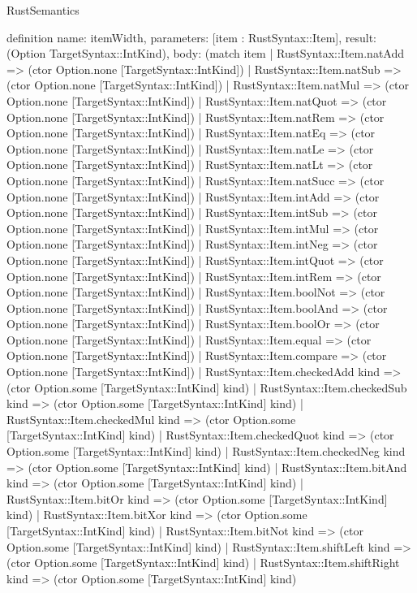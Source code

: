 \begin{lexlean}{RustSemantics}
\begin{semanticmodule}
definition{
  name: itemWidth,
  parameters: [item : RustSyntax::Item],
  result: (Option TargetSyntax::IntKind),
  body: (match item
    | RustSyntax::Item.natAdd => (ctor Option.none [TargetSyntax::IntKind])
    | RustSyntax::Item.natSub => (ctor Option.none [TargetSyntax::IntKind])
    | RustSyntax::Item.natMul => (ctor Option.none [TargetSyntax::IntKind])
    | RustSyntax::Item.natQuot => (ctor Option.none [TargetSyntax::IntKind])
    | RustSyntax::Item.natRem => (ctor Option.none [TargetSyntax::IntKind])
    | RustSyntax::Item.natEq => (ctor Option.none [TargetSyntax::IntKind])
    | RustSyntax::Item.natLe => (ctor Option.none [TargetSyntax::IntKind])
    | RustSyntax::Item.natLt => (ctor Option.none [TargetSyntax::IntKind])
    | RustSyntax::Item.natSucc => (ctor Option.none [TargetSyntax::IntKind])
    | RustSyntax::Item.intAdd => (ctor Option.none [TargetSyntax::IntKind])
    | RustSyntax::Item.intSub => (ctor Option.none [TargetSyntax::IntKind])
    | RustSyntax::Item.intMul => (ctor Option.none [TargetSyntax::IntKind])
    | RustSyntax::Item.intNeg => (ctor Option.none [TargetSyntax::IntKind])
    | RustSyntax::Item.intQuot => (ctor Option.none [TargetSyntax::IntKind])
    | RustSyntax::Item.intRem => (ctor Option.none [TargetSyntax::IntKind])
    | RustSyntax::Item.boolNot => (ctor Option.none [TargetSyntax::IntKind])
    | RustSyntax::Item.boolAnd => (ctor Option.none [TargetSyntax::IntKind])
    | RustSyntax::Item.boolOr => (ctor Option.none [TargetSyntax::IntKind])
    | RustSyntax::Item.equal => (ctor Option.none [TargetSyntax::IntKind])
    | RustSyntax::Item.compare => (ctor Option.none [TargetSyntax::IntKind])
    | RustSyntax::Item.checkedAdd kind => (ctor Option.some [TargetSyntax::IntKind] kind)
    | RustSyntax::Item.checkedSub kind => (ctor Option.some [TargetSyntax::IntKind] kind)
    | RustSyntax::Item.checkedMul kind => (ctor Option.some [TargetSyntax::IntKind] kind)
    | RustSyntax::Item.checkedQuot kind => (ctor Option.some [TargetSyntax::IntKind] kind)
    | RustSyntax::Item.checkedNeg kind => (ctor Option.some [TargetSyntax::IntKind] kind)
    | RustSyntax::Item.bitAnd kind => (ctor Option.some [TargetSyntax::IntKind] kind)
    | RustSyntax::Item.bitOr kind => (ctor Option.some [TargetSyntax::IntKind] kind)
    | RustSyntax::Item.bitXor kind => (ctor Option.some [TargetSyntax::IntKind] kind)
    | RustSyntax::Item.bitNot kind => (ctor Option.some [TargetSyntax::IntKind] kind)
    | RustSyntax::Item.shiftLeft kind => (ctor Option.some [TargetSyntax::IntKind] kind)
    | RustSyntax::Item.shiftRight kind => (ctor Option.some [TargetSyntax::IntKind] kind)
}
\end{semanticmodule}
\end{lexlean}
